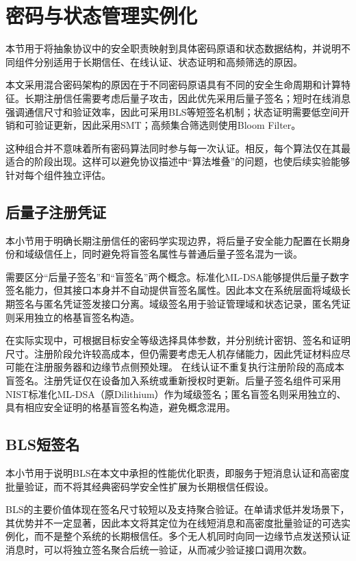 \documentclass[conference]{IEEEtran}
\begin{document}
	\section{密码与状态管理实例化}
	
	本节用于将抽象协议中的安全职责映射到具体密码原语和状态数据结构，并说明不同组件分别适用于长期信任、在线认证、状态证明和高频筛选的原因。
	
	本文采用混合密码架构的原因在于不同密码原语具有不同的安全生命周期和计算特征。长期注册信任需要考虑后量子攻击，因此优先采用后量子签名；短时在线消息强调通信尺寸和验证效率，因此可采用BLS等短签名机制；状态证明需要低空间开销和可验证更新，因此采用SMT；高频集合筛选则使用Bloom Filter。
	
	这种组合并不意味着所有密码算法同时参与每一次认证。相反，每个算法仅在其最适合的阶段出现。这样可以避免协议描述中“算法堆叠”的问题，也使后续实验能够针对每个组件独立评估。
	
	\subsection{后量子注册凭证}
	
	本小节用于明确长期注册信任的密码学实现边界，将后量子安全能力配置在长期身份和域级信任上，同时避免将盲签名属性与普通后量子签名混为一谈。
	
	需要区分“后量子签名”和“盲签名”两个概念。标准化ML-DSA能够提供后量子数字签名能力，但其接口本身并不自动提供盲签名属性。因此本文在系统层面将域级长期签名与匿名凭证签发接口分离。域级签名用于验证管理域和状态记录，匿名凭证则采用独立的格基盲签名构造。
	
	在实际实现中，可根据目标安全等级选择具体参数，并分别统计密钥、签名和证明尺寸。注册阶段允许较高成本，但仍需要考虑无人机存储能力，因此凭证材料应尽可能在注册服务器和边缘节点侧预处理。
	在线认证不重复执行注册阶段的高成本盲签名。注册凭证仅在设备加入系统或重新授权时更新。后量子签名组件可采用NIST标准化ML-DSA（原Dilithium）作为域级签名；匿名盲签名则采用独立的、具有相应安全证明的格基盲签名构造，避免概念混用。
	
	\subsection{BLS短签名}
	
	本小节用于说明BLS在本文中承担的性能优化职责，即服务于短消息认证和高密度批量验证，而不将其经典密码学安全性扩展为长期根信任假设。
	
	BLS的主要价值体现在签名尺寸较短以及支持聚合验证。在单请求低并发场景下，其优势并不一定显著，因此本文将其定位为在线短消息和高密度批量验证的可选实例化，而不是整个系统的长期根信任。多个无人机同时向同一边缘节点发送预认证消息时，可以将独立签名聚合后统一验证，从而减少验证接口调用次数。
	
\end{document}
